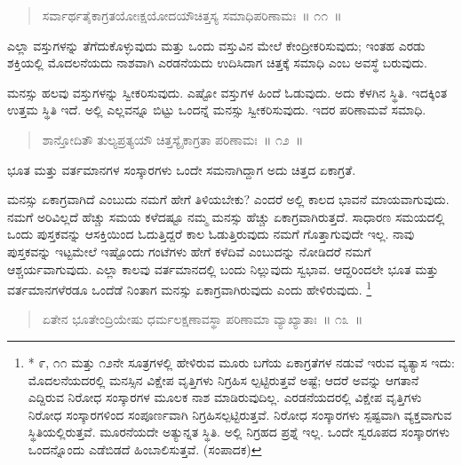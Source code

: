 \begin{verse}
ಸರ್ವಾರ್ಥತೈಕಾಗ್ರತಯೋಃಕ್ಷಯೋದಯೌಚಿತ್ತಸ್ಯ ಸಮಾಧಿಪರಿಣಾಮಃ~॥ ೧೧~॥
\end{verse}

\vspace{-0.3cm}

ಎಲ್ಲಾ ವಸ್ತುಗಳನ್ನು ತೆಗೆದುಕೊಳ್ಳುವುದು ಮತ್ತು ಒಂದು ವಸ್ತುವಿನ ಮೇಲೆ ಕೇಂದ್ರೀಕರಿಸುವುದು; ಇಂತಹ ಎರಡು ಶಕ್ತಿಯಲ್ಲಿ ಮೊದಲನೆಯದು ನಾಶವಾಗಿ ಎರಡನೆಯದು ಉದಿಸಿದಾಗ ಚಿತ್ತಕ್ಕೆ ಸಮಾಧಿ ಎಂಬ ಅವಸ್ಥೆ ಬರುವುದು. 

ಮನಸ್ಸು ಹಲವು ವಸ್ತುಗಳನ್ನು ಸ್ವೀಕರಿಸುವುದು. ಎಷ್ಟೋ ವಸ್ತುಗಳ ಹಿಂದೆ ಓಡುವುದು. ಅದು ಕೆಳಗಿನ ಸ್ಥಿತಿ. ಇದಕ್ಕಿಂತ ಉತ್ತಮ ಸ್ಥಿತಿ ಇದೆ. ಅಲ್ಲಿ ಎಲ್ಲವನ್ನೂ ಬಿಟ್ಟು ಒಂದನ್ನೆ ಮನಸ್ಸು ಸ್ವೀಕರಿಸುವುದು. ಇದರ ಪರಿಣಾಮವೆ ಸಮಾಧಿ. 

\vspace{-0.3cm}

\begin{verse}
ಶಾನ್ತೋದಿತೌ ತುಲ್ಯಪ್ರತ್ಯಯೌ ಚಿತ್ತಸ್ಯೈಕಾಗ್ರತಾ ಪರಿಣಾಮಃ~॥ ೧೨~॥
\end{verse}

\vspace{-0.3cm}

ಭೂತ ಮತ್ತು ವರ್ತಮಾನಗಳ ಸಂಸ್ಕಾರಗಳು ಒಂದೇ ಸಮನಾಗಿದ್ದಾಗ ಅದು ಚಿತ್ತದ ಏಕಾಗ್ರತೆ. 

ಮನಸ್ಸು ಏಕಾಗ್ರವಾಗಿದೆ ಎಂಬುದು ನಮಗೆ ಹೇಗೆ ತಿಳಿಯಬೇಕು? ಎಂದರೆ ಅಲ್ಲಿ ಕಾಲದ ಭಾವನೆ ಮಾಯವಾಗುವುದು. ನಮಗೆ ಅರಿವಿಲ್ಲದೆ ಹೆಚ್ಚು ಸಮಯ ಕಳೆದಷ್ಟೂ ನಮ್ಮ ಮನಸ್ಸು ಹೆಚ್ಚು ಏಕಾಗ್ರವಾಗಿರುತ್ತದೆ. ಸಾಧಾರಣ ಸಮಯದಲ್ಲಿ ಒಂದು ಪುಸ್ತಕವನ್ನು ಆಸಕ್ತಿಯಿಂದ ಓದುತ್ತಿದ್ದರೆ ಕಾಲ ಓಡುತ್ತಿರುವುದು ನಮಗೆ ಗೊತ್ತಾಗುವುದೇ ಇಲ್ಲ. ನಾವು ಪುಸ್ತಕವನ್ನು ಇಟ್ಟಮೇಲೆ ಇಷ್ಟೊಂದು ಗಂಟೆಗಳು ಹೇಗೆ ಕಳೆದಿವೆ ಎಂಬುದನ್ನು ನೋಡಿದರೆ ನಮಗೆ ಆಶ್ಚರ್ಯವಾಗುವುದು. ಎಲ್ಲಾ ಕಾಲವು ವರ್ತಮಾನದಲ್ಲಿ ಬಂದು ನಿಲ್ಲುವುದು ಸ್ವಭಾವ. ಆದ್ದರಿಂದಲೇ ಭೂತ ಮತ್ತು ವರ್ತಮಾನಗಳೆರಡೂ ಒಂದೆಡೆ ನಿಂತಾಗ ಮನಸ್ಸು ಏಕಾಗ್ರವಾಗಿರುವುದು ಎಂದು ಹೇಳಿರುವುದು. \footnote{* ೯, ೧೧ ಮತ್ತು ೧೨ನೇ ಸೂತ್ರಗಳಲ್ಲಿ ಹೇಳಿರುವ ಮೂರು ಬಗೆಯ ಏಕಾಗ್ರತೆಗಳ ನಡುವೆ ಇರುವ ವ್ಯತ್ಯಾಸ ಇದು: ಮೊದಲನೆಯದರಲ್ಲಿ ಮನಸ್ಸಿನ ವಿಕ್ಷೇಪ ವೃತ್ತಿಗಳು ನಿಗ್ರಹಿಸ ಲ್ಪಟ್ಟಿರುತ್ತವೆ ಅಷ್ಟೆ; ಆದರೆ ಅವನ್ನು ಆಗತಾನೆ ಎದ್ದಿರುವ ನಿರೋಧ ಸಂಸ್ಕಾರಗಳ ಮೂಲಕ ನಾಶ ಮಾಡಿರುವುದಿಲ್ಲ. ಎರಡನೆಯದರಲ್ಲಿ ವಿಕ್ಷೇಪ ವೃತ್ತಿಗಳು ನಿರೋಧ ಸಂಸ್ಕಾರಗಳಿಂದ ಸಂಪೂರ್ಣವಾಗಿ ನಿಗ್ರಹಿಸಲ್ಪಟ್ಟಿರುತ್ತವೆ. ನಿರೋಧ ಸಂಸ್ಕಾರಗಳು ಸ್ಪಷ್ಟವಾಗಿ ವ್ಯಕ್ತವಾಗುವ ಸ್ಥಿತಿಯಲ್ಲಿರುತ್ತವೆ. ಮೂರನೆಯದೇ ಅತ್ಯುನ್ನತ ಸ್ಥಿತಿ. ಅಲ್ಲಿ ನಿಗ್ರಹದ ಪ್ರಶ್ನೆ ಇಲ್ಲ. ಒಂದೇ ಸ್ವರೂಪದ ಸಂಸ್ಕಾರಗಳು ಒಂದನ್ನೊಂದು ಎಡೆಬಿಡದೆ ಹಿಂಬಾಲಿಸುತ್ತವೆ. (ಸಂಪಾದಕ)}

\vspace{-0.3cm}

\begin{verse}
ಏತೇನ ಭೂತೇಂದ್ರಿಯೇಷು ಧರ್ಮಲಕ್ಷಣಾವಸ್ಥಾ ಪರಿಣಾಮಾ ವ್ಯಾಖ್ಯಾತಾಃ~॥ ೧೩~॥
\end{verse}

\vspace{-0.3cm}

